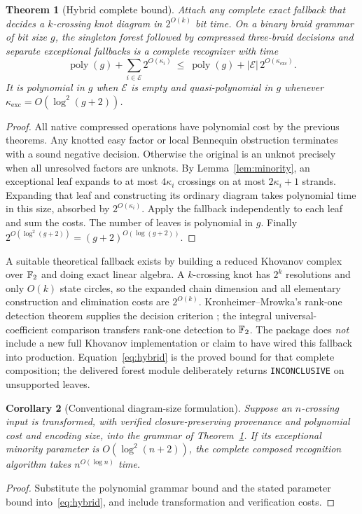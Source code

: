 \documentclass[11pt,letterpaper]{article}
\newtheorem{theorem}{Theorem}[section]
\newtheorem{corollary}[theorem]{Corollary}
\theoremstyle{definition}\newtheorem{definition}[theorem]{Definition}
\theoremstyle{remark}\newtheorem{remark}[theorem]{Remark}
\newcommand{\poly}{\operatorname{poly}}
\newcommand{\exc}{\mathrm{exc}}
\begin{document}
\begin{theorem}[Hybrid complete bound]\label{thm:hybrid}
Attach any complete exact fallback that decides a $k$-crossing knot diagram in $2^{O(k)}$ bit time. On a binary braid grammar of bit size $g$, the singleton forest followed by compressed three-braid decisions and separate exceptional fallbacks is a complete recognizer with time
\begin{equation}\label{eq:hybrid}
 \poly(g)+\sum_{i\in\mathcal E}2^{O(\kappa_i)}
 \ \le\ \poly(g)+|\mathcal E|\,2^{O(\kappa_{\exc})}.
\end{equation}
It is polynomial in $g$ when $\mathcal E$ is empty and quasi-polynomial in $g$ whenever $\kappa_{\exc}=O(\log^2(g+2))$.
\end{theorem}
\begin{proof}
All native compressed operations have polynomial cost by the previous theorems. Any knotted easy factor or local Bennequin obstruction terminates with a sound negative decision. Otherwise the original is an unknot precisely when all unresolved factors are unknots. By Lemma~\ref{lem:minority}, an exceptional leaf expands to at most $4\kappa_i$ crossings on at most $2\kappa_i+1$ strands. Expanding that leaf and constructing its ordinary diagram takes polynomial time in this size, absorbed by $2^{O(\kappa_i)}$. Apply the fallback independently to each leaf and sum the costs. The number of leaves is polynomial in $g$. Finally $2^{O(\log^2(g+2))}=(g+2)^{O(\log(g+2))}$.
\end{proof}

A suitable theoretical fallback exists by building a reduced Khovanov complex over $\mathbb F_2$ and doing exact linear algebra. A $k$-crossing knot has $2^k$ resolutions and only $O(k)$ state circles, so the expanded chain dimension and all elementary construction and elimination costs are $2^{O(k)}$. Kronheimer--Mrowka's rank-one detection theorem supplies the decision criterion \cite{km}; the integral universal-coefficient comparison transfers rank-one detection to $\mathbb F_2$. The package does \emph{not} include a new full Khovanov implementation or claim to have wired this fallback into production. Equation~\eqref{eq:hybrid} is the proved bound for that complete composition; the delivered forest module deliberately returns \texttt{INCONCLUSIVE} on unsupported leaves.

\begin{corollary}[Conventional diagram-size formulation]\label{cor:qp}
Suppose an $n$-crossing input is transformed, with verified closure-preserving provenance and polynomial cost and encoding size, into the grammar of Theorem~\ref{thm:hybrid}. If its exceptional minority parameter is $O(\log^2(n+2))$, the complete composed recognition algorithm takes $n^{O(\log n)}$ time.
\end{corollary}
\begin{proof}
Substitute the polynomial grammar bound and the stated parameter bound into~\eqref{eq:hybrid}, and include transformation and verification costs.
\end{proof}
\end{document}
